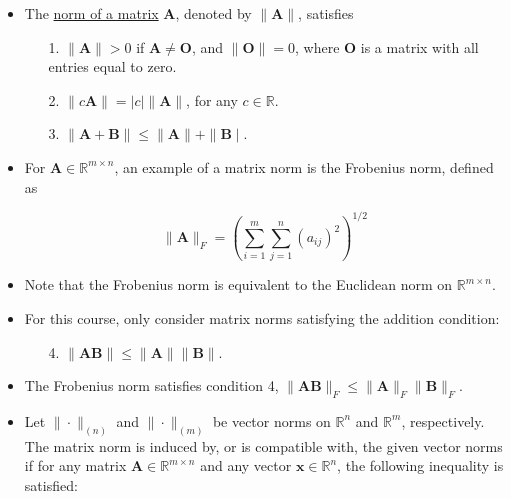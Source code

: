 \documentclass[12pt,thmsa]{article}
\begin{document}
\begin{itemize}
	\item The \underline{norm of a matrix} \(\boldsymbol{A}\), denoted by \(\| \boldsymbol{A} \|\), satisfies
	
	\begin{itemize}
	\item[1.] \(\|\boldsymbol{A}\|>0\) if \(\boldsymbol{A} \neq \boldsymbol{O}\), and \(\|\boldsymbol{O}\|=0\), where \(\boldsymbol{O}\) is a matrix with all entries equal to zero.
	
	\item[2.]  \(\|c \boldsymbol{A}\|=|c|\|\boldsymbol{A}\|\), for any \(c \in \mathbb{R}\).
	
	\item[3.]  \(\|\boldsymbol{A}+\boldsymbol{B}\| \leq\|\boldsymbol{A}\|+\| \boldsymbol{B} \mid\).
	
	\end{itemize}

	\item For \(\boldsymbol{A} \in \mathbb{R}^{m \times n}\), an example of a matrix norm is the Frobenius norm, defined as
	
	\begin{equation*}
		\|\boldsymbol{A}\|_{F}=\left(\sum_{i=1}^{m} \sum_{j=1}^{n}\left(a_{i j}\right)^{2}\right)^{1 / 2}
	\end{equation*}
	
	\item Note that the Frobenius norm is equivalent to the Euclidean norm on \(\mathbb{R}^{m \times n}\).
	
	\item For this course, only consider matrix norms satisfying the addition condition:
	
	\begin{itemize}
		\item[4.]\(\|\boldsymbol{A B}\| \leq\|\boldsymbol{A}\|\|\boldsymbol{B}\|\).
	\end{itemize}

	\item The Frobenius norm satisfies condition 4, \(\|\boldsymbol{A B}\|_{F} \leq\|\boldsymbol{A}\|_{F} \|\boldsymbol{B}\|_{F} \).
	
	\item Let \(\|\cdot\|_{(n)}\) and \(\|\cdot\|_{(m)}\) be vector norms on \(\mathbb{R}^{n}\) and \(\mathbb{R}^{m}\), respectively. The matrix norm is induced by, or is compatible with, the given vector norms if for any matrix \(\boldsymbol{A} \in \mathbb{R}^{m \times n}\) and any vector \(\boldsymbol{x} \in \mathbb{R}^{n}\), the following inequality is satisfied:
	

\end{itemize}
\end{document}
